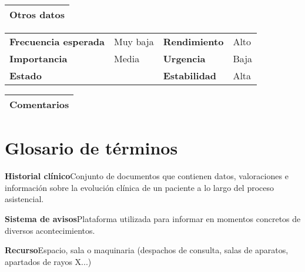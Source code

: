\documentclass[11pt,a4paper]{article}
\newcommand{\term}[2]{\textbf{#1}\quad#2}
\begin{document}
\begin{table}[H]
	\begin{tabularx}{\textwidth}{X}
		\textbf{Otros datos}\\ \hline
	\end{tabularx}
	\begin{tabularx}{\textwidth}{lXlX}
		\textbf{Frecuencia esperada} & Muy baja & \textbf{Rendimiento} & Alto\\
		\textbf{Importancia} & Media & \textbf{Urgencia} & Baja\\
		\textbf{Estado} &  & \textbf{Estabilidad} & Alta \\
	\end{tabularx}
	
	\begin{tabularx}{\textwidth}{X}
		\textbf{Comentarios}\\ \hline
	\end{tabularx}
\end{table}

\newpage


\section{Glosario de términos}
\term{Historial clínico} Conjunto de documentos que contienen datos, valoraciones e información sobre la evolución clínica de un paciente a lo largo del proceso asistencial.

\term{Sistema de avisos} Plataforma utilizada para informar en momentos concretos de diversos acontecimientos.

\term{Recurso} Espacio, sala o maquinaria (despachos de consulta, salas de aparatos, apartados de rayos X...) 

\end{document}
